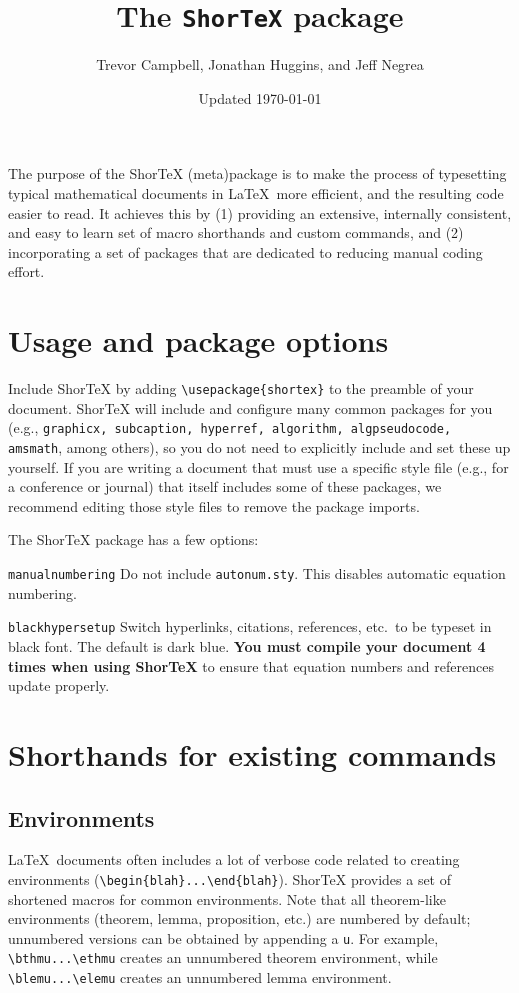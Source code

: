 \documentclass{article}
\title{The \texttt{ShorTeX} package}
\author{Trevor Campbell, Jonathan Huggins, and Jeff Negrea}
\date{Updated \today}
\begin{document}
\maketitle


\babs
The purpose of the ShorTeX (meta)package is to make the process of typesetting
typical mathematical documents in \LaTeX~more efficient, and the resulting
code easier to read.  It achieves this by 
(1) providing an
extensive, internally consistent, and easy to learn set of macro
shorthands and custom commands, and 
(2) incorporating a set of packages that are
dedicated to reducing manual coding effort.
\eabs


\tableofcontents

\section{Usage and package options}\label{sec:usage}


Include ShorTeX by adding \verb!\usepackage{shortex}! to the preamble of your document.
ShorTeX will include and configure many common packages for you (e.g., \texttt{graphicx, subcaption, hyperref, algorithm, algpseudocode, amsmath}, among others),
so you do not need to explicitly include and set these up yourself.
If you are writing a document that must use a specific style file (e.g., for a conference or journal) that itself
includes some of these packages, we recommend editing those style files to remove the package imports.

The ShorTeX package has a few options:
\bdesc
\item[\texttt{manualnumbering}] Do not include \texttt{autonum.sty}. This disables automatic equation numbering.
\item[\texttt{blackhypersetup}] Switch hyperlinks, citations, references, etc.~to be typeset in black font. The default is dark blue.
\edesc
\textbf{You must compile your document 4 times when using ShorTeX} to ensure that equation
numbers and references update properly.

\section{Shorthands for existing commands}

\subsection{Environments}

\LaTeX~documents often includes a lot of verbose code
related to creating environments (\verb!\begin{blah}...\end{blah}!). ShorTeX provides a set of 
shortened macros for common environments.
Note that all theorem-like environments (theorem, lemma, proposition, etc.) 
are numbered by default; unnumbered versions can be obtained by appending a \verb!u!. For example,
\verb!\bthmu...\ethmu! creates an unnumbered theorem environment, while
\verb!\blemu...\elemu! creates an unnumbered lemma environment.
\end{document}
